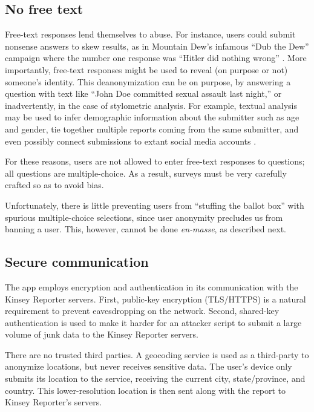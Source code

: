 \documentclass{sigchi}
\begin{document}
\subsection{No free text}

Free-text responses lend themselves to abuse. For instance, users could submit nonsense answers to skew results, as in Mountain Dew's infamous ``Dub the Dew'' campaign where the number one response was ``Hitler did nothing wrong'' \cite{Rosenfeld2012}. More importantly, free-text responses might be used to reveal (on purpose or not) someone's identity.
This deanonymization can be on purpose, by answering a question with text like ``John Doe committed sexual assault last night,'' or inadvertently, in the case of stylometric analysis. For example, textual analysis may be used to infer demographic information about the submitter such as age and gender, tie together multiple reports coming from the same submitter, and even possibly connect submissions to extant social media accounts \cite{Johansson2013, Korayem2013, Peersman2011}.

 For these reasons, users are not allowed to enter free-text responses to questions; all questions are multiple-choice. As a result, surveys must be very carefully crafted so as to avoid bias.

Unfortunately, there is little preventing users from ``stuffing the ballot box'' with spurious multiple-choice selections, since user anonymity precludes us from banning a user. This, however, cannot be done \textit{en-masse}, as described next. 

\subsection{Secure communication}

The app employs encryption and authentication in its communication with the Kinsey Reporter servers. First, public-key encryption (TLS/HTTPS) is a natural requirement to prevent eavesdropping on the network. Second, shared-key authentication is used to make it harder for an attacker script to submit a large volume of junk data to the Kinsey Reporter servers.

There are no trusted third parties. A geocoding service is used as a third-party to anonymize locations, but never receives sensitive data. The user's device only submits its location to the service, receiving the current city, state/province, and country. This lower-resolution location is then sent along with the report to Kinsey Reporter's servers.
\end{document}
